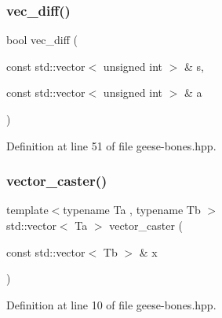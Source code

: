 \subsubsection{\texorpdfstring{vec\+\_\+diff()}{vec\_diff()}}
{\footnotesize\ttfamily bool vec\+\_\+diff (\begin{DoxyParamCaption}\item[{const std\+::vector$<$ unsigned int $>$ \&}]{s,  }\item[{const std\+::vector$<$ unsigned int $>$ \&}]{a }\end{DoxyParamCaption})\hspace{0.3cm}{\ttfamily [inline]}}



Definition at line 51 of file geese-\/bones.\+hpp.

\mbox{\label{geese-bones_8hpp_a13c91ee42db6c3b986acbbac4ee58cb0}} 
\subsubsection{\texorpdfstring{vector\+\_\+caster()}{vector\_caster()}}
{\footnotesize\ttfamily template$<$typename Ta , typename Tb $>$ \\
std\+::vector$<$ Ta $>$ vector\+\_\+caster (\begin{DoxyParamCaption}\item[{const std\+::vector$<$ Tb $>$ \&}]{x }\end{DoxyParamCaption})\hspace{0.3cm}{\ttfamily [inline]}}



Definition at line 10 of file geese-\/bones.\+hpp.

